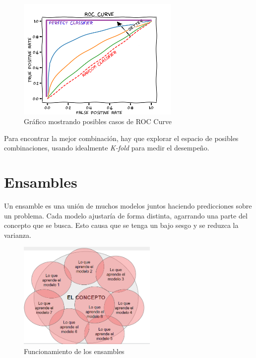 \documentclass[titlepage,a4paper]{article}
\begin{document}
\begin{figure}[!htb]
    \centering
    \includegraphics[width=0.7\textwidth]{imagenesResumen/ROCCurve.png}
    \caption{Gráfico mostrando posibles casos de ROC Curve}
    \label{ROCCurve}
\end{figure}



Para encontrar la mejor combinación, hay que explorar el espacio de posibles combinaciones, usando idealmente \textit{K-fold} para medir el desempeño.

\newpage

\section{Ensambles}

Un ensamble es una unión de muchos modelos juntos haciendo predicciones sobre un problema. Cada modelo ajustaría de forma distinta, agarrando una parte del concepto que se busca. Esto causa que se tenga un bajo sesgo y se reduzca la varianza.

\begin{figure}[!htb]
    \centering
    \includegraphics[width=0.6\textwidth]{imagenesResumen/ConceptoEnsamble.PNG}
    \caption{Funcionamiento de los ensambles}
\end{figure}
\end{document}
